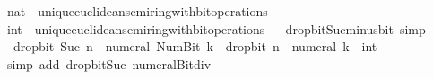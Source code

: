 \begin{isabellebody}
\isamarkupfalse%
%
\endisatagproof
{\isafoldproof}%
%
\isadelimproof
\isanewline
%
\endisadelimproof
\isanewline
{}\isamarkupfalse%
\isanewline
\isanewline
{}\isamarkupfalse%
\ nat\ {\isacharcolon}{\kern0pt}{\isacharcolon}{\kern0pt}\ unique{\isacharunderscore}{\kern0pt}euclidean{\isacharunderscore}{\kern0pt}semiring{\isacharunderscore}{\kern0pt}with{\isacharunderscore}{\kern0pt}bit{\isacharunderscore}{\kern0pt}operations%
\isadelimproof
\ %
\endisadelimproof
%
\isatagproof
\isacommand{{\isachardot}{\kern0pt}{\isachardot}{\kern0pt}}\isamarkupfalse%
%
\endisatagproof
{\isafoldproof}%
%
\isadelimproof
%
\endisadelimproof
\isanewline
\isanewline
{}\isamarkupfalse%
\ int\ {\isacharcolon}{\kern0pt}{\isacharcolon}{\kern0pt}\ unique{\isacharunderscore}{\kern0pt}euclidean{\isacharunderscore}{\kern0pt}semiring{\isacharunderscore}{\kern0pt}with{\isacharunderscore}{\kern0pt}bit{\isacharunderscore}{\kern0pt}operations%
\isadelimproof
\ %
\endisadelimproof
%
\isatagproof
\isacommand{{\isachardot}{\kern0pt}{\isachardot}{\kern0pt}}\isamarkupfalse%
%
\endisatagproof
{\isafoldproof}%
%
\isadelimproof
%
\endisadelimproof
\isanewline
\isanewline
{}\isamarkupfalse%
\ drop{\isacharunderscore}{\kern0pt}bit{\isacharunderscore}{\kern0pt}Suc{\isacharunderscore}{\kern0pt}minus{\isacharunderscore}{\kern0pt}bit{}\ {\isacharbrackleft}{\kern0pt}simp{\isacharbrackright}{\kern0pt}{\isacharcolon}{\kern0pt}\isanewline
\ \ {\isacartoucheopen}drop{\isacharunderscore}{\kern0pt}bit\ {\isacharparenleft}{\kern0pt}Suc\ n{\isacharparenright}{\kern0pt}\ {\isacharparenleft}{\kern0pt}{\isacharminus}{\kern0pt}\ numeral\ {\isacharparenleft}{\kern0pt}Num{\isachardot}{\kern0pt}Bit{}\ k{\isacharparenright}{\kern0pt}{\isacharparenright}{\kern0pt}\ {\isacharequal}{\kern0pt}\ drop{\isacharunderscore}{\kern0pt}bit\ n\ {\isacharparenleft}{\kern0pt}{\isacharminus}{\kern0pt}\ numeral\ k\ {\isacharcolon}{\kern0pt}{\isacharcolon}{\kern0pt}\ int{\isacharparenright}{\kern0pt}{\isacartoucheclose}\isanewline
%
\isadelimproof
\ \ %
\endisadelimproof
%
\isatagproof
{}\isamarkupfalse%
\ {\isacharparenleft}{\kern0pt}simp\ add{\isacharcolon}{\kern0pt}\ drop{\isacharunderscore}{\kern0pt}bit{\isacharunderscore}{\kern0pt}Suc\ numeral{\isacharunderscore}{\kern0pt}Bit{}{\isacharunderscore}{\kern0pt}div{\isacharunderscore}{\kern0pt}{}{\isacharparenright}{\kern0pt}%
\endisatagproof
{\isafoldproof}%
%
\isadelimproof
\isanewline
%
\endisadelimproof
\isanewline
{}\isamarkupfalse%

\end{isabellebody}
